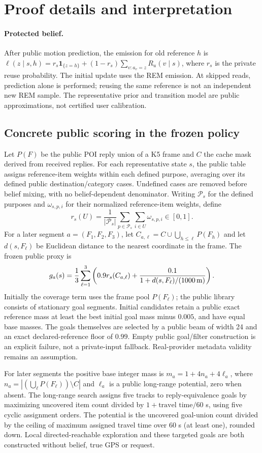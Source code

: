 \section{Proof details and interpretation}
\paragraph{Protected belief.}
After public motion prediction, the emission for old reference $h$ is
$\ell(z\mid s,h)=r_s\mathbf1_{\{z=h\}}+
(1-r_s)\sum_{v:a_v=z}R_u(v\mid s)$, where $r_s$ is the private reuse probability.
The initial update uses the REM emission. At skipped reads, prediction alone
is performed; reusing the same reference is not an independent new REM sample.
The representative prior and transition model are public approximations, not
certified user calibration.
\subsection{Concrete public scoring in the frozen policy}
Let $P(F)$ be the public POI reply union of a K5 frame and $C$ the cache mask
derived from received replies. For each representative state $s$, the public
table assigns reference-item weights within each defined purpose, averaging
over its defined public destination/category cases. Undefined cases are removed
before belief mixing, with no belief-dependent denominator.
Writing $\mathcal P_s$ for the defined purposes and $\omega_{s,p,i}$ for
their normalized reference-item weights, define
\[
r_s(U)=\frac{1}{|\mathcal P_s|}
 \sum_{p\in\mathcal P_s}\sum_{i\in U}\omega_{s,p,i}\in[0,1].
\]
For a later segment $a=(F_1,F_2,F_3)$, let
$C_{a,\ell}=C\cup\bigcup_{h\le\ell}P(F_h)$ and let
$d(s,F_\ell)$ be Euclidean distance to the nearest coordinate in the frame.
The frozen public proxy is
\[
g_a(s)=\frac13\sum_{\ell=1}^3
\left(0.9r_s(C_{a,\ell})+
\frac{0.1}{1+d(s,F_\ell)/(1000\,{\rm m})}\right).
\]
Initially the coverage term uses the frame pool $P(F_\ell)$; the public
library consists of stationary goal segments. Initial candidates retain a
public exact reference mass at least the best initial goal mass minus $0.005$,
and have equal base masses. The goals themselves are selected by a public
beam of width 24 and an exact declared-reference floor of $0.99$.
Empty public goal/filter construction is an explicit failure, not a
private-input fallback. Real-provider metadata validity remains an assumption.

For later segments the positive base integer mass is
$m_a=1+4n_a+4\ell_a$, where
$n_a=|(\bigcup_\ell P(F_\ell))\setminus C|$ and $\ell_a$ is a public
long-range potential, zero when absent. The long-range search assigns
five tracks to reply-equivalence goals by maximizing uncovered item count
divided by $1+\text{travel time}/60$ s, using five cyclic assignment orders.
The potential is the uncovered goal-union count divided by the ceiling of
maximum assigned travel time over 60 s (at least one), rounded down.
Local directed-reachable exploration and these targeted goals are both
constructed without belief, true GPS or request.

